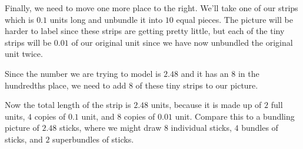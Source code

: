 \documentclass{ximera}
\begin{document}
\begin{example}
\begin{image}
\end{image}

Finally, we need to move one more place to the right. We'll take one of our strips which is $0.1$ units long and unbundle it into $10$ equal pieces. The picture will be harder to label since these strips are getting pretty little, but each of the tiny strips will be $0.01$ of our original unit since we have now unbundled the original unit twice.

\begin{image}
\end{image}

Since the number we are trying to model is $2.48$ and it has an $8$ in the hundredths place, we need to add $8$ of these tiny strips to our picture.

\begin{image}
\end{image}

Now the total length of the strip is $2.48$ units, because it is made up of $2$ full units, $4$ copies of $0.1$ unit, and $8$ copies of $0.01$ unit. Compare this to a bundling picture of $2.48$ sticks, where we might draw $8$ individual sticks, $4$ bundles of sticks, and $2$ superbundles of sticks.


\end{example}
\end{document}
